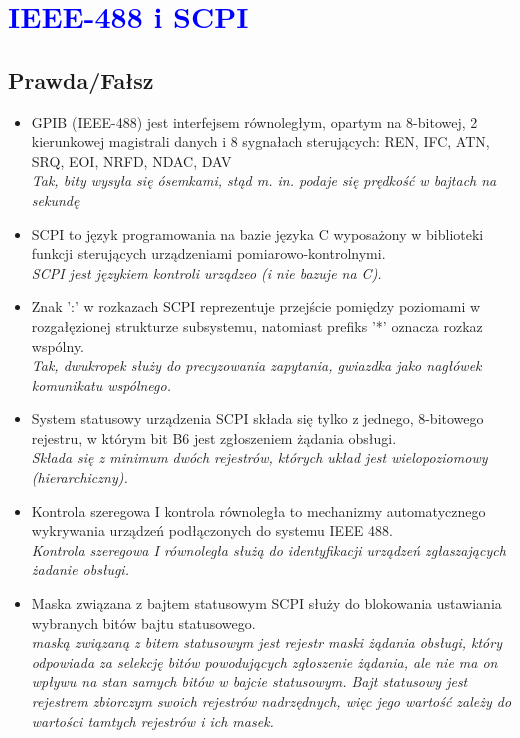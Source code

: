 \section{\textcolor{blue}{IEEE-488 i SCPI}}
\subsection*{Prawda/Fałsz}
\begin{itemize}
	
	\item \textcolor{tak}{GPIB (IEEE-488) jest interfejsem równoległym, opartym na 8-bitowej, 2 kierunkowej magistrali danych i 8 sygnałach sterujących: REN, IFC, ATN, SRQ, EOI, NRFD, NDAC, DAV} \\
	{\small \emph{Tak, bity wysyła się ósemkami, stąd m. in. podaje się prędkość w bajtach na sekundę}}
	
	\item \textcolor{nie}{SCPI to język programowania na bazie języka C wyposażony w biblioteki funkcji sterujących urządzeniami pomiarowo-kontrolnymi.} \\
	{\small \emph{SCPI jest językiem kontroli urządzeo (i nie bazuje na C).}}
	
	\item \textcolor{tak}{Znak ':' w rozkazach SCPI reprezentuje przejście pomiędzy poziomami w rozgałęzionej strukturze subsystemu, natomiast prefiks '*' oznacza rozkaz wspólny.} \\
	{\small \emph{Tak, dwukropek służy do precyzowania zapytania, gwiazdka jako nagłówek komunikatu wspólnego.}}
	
	\item \textcolor{nie}{System statusowy urządzenia SCPI składa się tylko z jednego, 8-bitowego rejestru, w którym bit B6 jest zgłoszeniem żądania obsługi.} \\
	{\small \emph{Składa się z minimum dwóch rejestrów, których układ jest wielopoziomowy (hierarchiczny).}}
	
	\item \textcolor{nie}{Kontrola szeregowa I kontrola równoległa to mechanizmy automatycznego wykrywania urządzeń podłączonych do systemu IEEE 488.} \\
	{\small \emph{Kontrola szeregowa I równoległa służą do identyfikacji urządzeń zgłaszających żadanie obsługi.}}
	
	\item \textcolor{nie}{Maska związana z bajtem statusowym SCPI służy do blokowania ustawiania wybranych bitów bajtu statusowego.} \\
	{\small \emph{maską związaną z bitem statusowym jest rejestr maski żądania obsługi, który odpowiada za selekcję bitów powodujących zgłoszenie żądania, ale nie ma on wpływu na stan samych bitów w bajcie statusowym. Bajt statusowy jest rejestrem zbiorczym swoich rejestrów nadrzędnych, więc jego wartość zależy do wartości tamtych rejestrów i ich masek.}}
	
\end{itemize}

